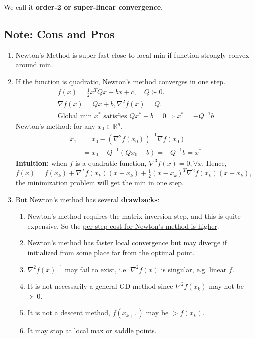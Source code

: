\documentclass[11pt,a4paper]{article}
\begin{document}
We call it \textbf{order-2 or super-linear convergence}.

\subsection{Note: Cons and Pros}
\begin{enumerate}[$\bullet$]
    \item Newton's Method is super-fast close to local min if function strongly convex around min.
    \item If the function is \underline{quadratic}, Newton's method converges in \underline{one step}.
    \begin{equation}
        \begin{aligned}
            f(x)=\frac{1}{2}x^TQx+bx+c,\quad Q\succ 0.\\
            \nabla f(x)=Qx+b,\nabla^2 f(x)=Q.\\
            \text{Global min $x^*$ satisfies } Qx^*+b=0 \Rightarrow	x^*=-Q^{-1}b
        \end{aligned}
        \nonumber
    \end{equation}
    Newton's method: for any $x_0\in \mathbb{R}^n$,
    \begin{equation}
        \begin{aligned}
            x_1&=x_0-(\nabla^2 f(x_0))^{-1}\nabla f(x_0)\\
            &=x_0-Q^{-1}(Qx_0+b)=-Q^{-1}b=x^*
        \end{aligned}
        \nonumber
    \end{equation}
    \textbf{Intuition:} when $f$ is a quadratic function, $\nabla^3 f(x)=0, \forall x$. Hence, $f(x)= f(x_k)+\nabla^T f(x_k)(x-x_k)+\frac{1}{2}(x-x_k)^T \nabla^2 f(x_k) (x-x_k)$, the minimization problem will get the min in one step.
    \item But Newton's method has several \textbf{drawbacks}:
    \begin{enumerate}[(1)]
        \item Newton’s method requires the matrix inversion step, and this is quite expensive. So the \underline{per step cost for Newton’s method is higher}.
        \item Newton’s method has faster local convergence but \underline{may diverge} if initialized from some place far from the optimal point.
        \item $\nabla^2 f(x)^{-1}$ may fail to exist, i.e. $\nabla^2 f(x)$ is singular, e.g. linear $f$.
        \item It is not necessarily a general GD method since $\nabla^2 f(x_k)$ may not be $\succ 0$.
        \item It is not a descent method, $f(x_{k+1})$ may be $> f(x_k)$.
        \item It may stop at local max or saddle points.
    \end{enumerate}
\end{enumerate}
\end{document}
